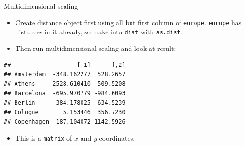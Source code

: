 \documentclass[ignorenonframetext,]{beamer}
\newenvironment{Shaded}{\begin{snugshade}}{\end{snugshade}}
\newcommand{\KeywordTok}[1]{\textcolor[rgb]{0.13,0.29,0.53}{\textbf{#1}}}
\newcommand{\NormalTok}[1]{#1}
\newcommand{\OperatorTok}[1]{\textcolor[rgb]{0.81,0.36,0.00}{\textbf{#1}}}
\newcommand{\StringTok}[1]{\textcolor[rgb]{0.31,0.60,0.02}{#1}}
\providecommand{\tightlist}{%
  \setlength{\itemsep}{0pt}\setlength{\parskip}{0pt}}
\begin{document}
\begin{frame}[fragile]{Multidimensional scaling}
\protect\hypertarget{multidimensional-scaling-2}{}

\begin{itemize}
\item
  Create distance object first using all but first column of
  \texttt{europe}. \texttt{europe} has distances in it already, so make
  into \texttt{dist} with \texttt{as.dist}.
\item
  Then run multidimensional scaling and look at result:
\end{itemize}

\begin{Shaded}
\end{Shaded}

\begin{verbatim}
##                   [,1]      [,2]
## Amsterdam  -348.162277  528.2657
## Athens     2528.610410 -509.5208
## Barcelona  -695.970779 -984.6093
## Berlin      384.178025  634.5239
## Cologne       5.153446  356.7230
## Copenhagen -187.104072 1142.5926
\end{verbatim}

\begin{itemize}
\tightlist
\item
  This is a \texttt{matrix} of \(x\) and \(y\) coordinates.
\end{itemize}

\end{frame}
\end{document}
